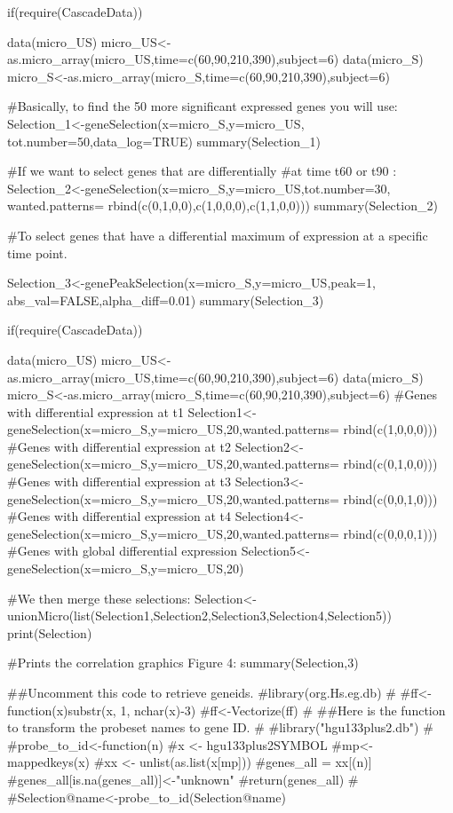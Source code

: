 \documentclass[a4paper]{book}
\begin{document}
\begin{Examples}
\begin{ExampleCode}

  if(require(CascadeData)){
	data(micro_US)
	micro_US<-as.micro_array(micro_US,time=c(60,90,210,390),subject=6)
	data(micro_S)
	micro_S<-as.micro_array(micro_S,time=c(60,90,210,390),subject=6)

  #Basically, to find the 50 more significant expressed genes you will use:
  Selection_1<-geneSelection(x=micro_S,y=micro_US,
  tot.number=50,data_log=TRUE)
  summary(Selection_1)
  
  #If we want to select genes that are differentially 
  #at time t60 or t90 :
  Selection_2<-geneSelection(x=micro_S,y=micro_US,tot.number=30,
  wanted.patterns=
  rbind(c(0,1,0,0),c(1,0,0,0),c(1,1,0,0)))
  summary(Selection_2)

  #To select genes that have a differential maximum of expression at a specific time point.
  
  Selection_3<-genePeakSelection(x=micro_S,y=micro_US,peak=1,
  abs_val=FALSE,alpha_diff=0.01)
  summary(Selection_3)
  }

  if(require(CascadeData)){
data(micro_US)
micro_US<-as.micro_array(micro_US,time=c(60,90,210,390),subject=6)
data(micro_S)
micro_S<-as.micro_array(micro_S,time=c(60,90,210,390),subject=6)
#Genes with differential expression at t1
Selection1<-geneSelection(x=micro_S,y=micro_US,20,wanted.patterns= rbind(c(1,0,0,0)))
#Genes with differential expression at t2
Selection2<-geneSelection(x=micro_S,y=micro_US,20,wanted.patterns= rbind(c(0,1,0,0)))
#Genes with differential expression at t3
Selection3<-geneSelection(x=micro_S,y=micro_US,20,wanted.patterns= rbind(c(0,0,1,0)))
#Genes with differential expression at t4
Selection4<-geneSelection(x=micro_S,y=micro_US,20,wanted.patterns= rbind(c(0,0,0,1)))
#Genes with global differential expression 
Selection5<-geneSelection(x=micro_S,y=micro_US,20)

#We then merge these selections:
Selection<-unionMicro(list(Selection1,Selection2,Selection3,Selection4,Selection5))
print(Selection)

#Prints the correlation graphics Figure 4:
summary(Selection,3)

##Uncomment this code to retrieve geneids.
#library(org.Hs.eg.db)
#
#ff<-function(x){substr(x, 1, nchar(x)-3)}
#ff<-Vectorize(ff)
#
##Here is the function to transform the probeset names to gene ID.
#
#library("hgu133plus2.db")
#
#probe_to_id<-function(n){  
#x <- hgu133plus2SYMBOL
#mp<-mappedkeys(x)
#xx <- unlist(as.list(x[mp]))
#genes_all = xx[(n)]
#genes_all[is.na(genes_all)]<-"unknown"
#return(genes_all)
#}
#Selection@name<-probe_to_id(Selection@name)
  }
	
\end{ExampleCode}
\end{Examples}
\end{document}
